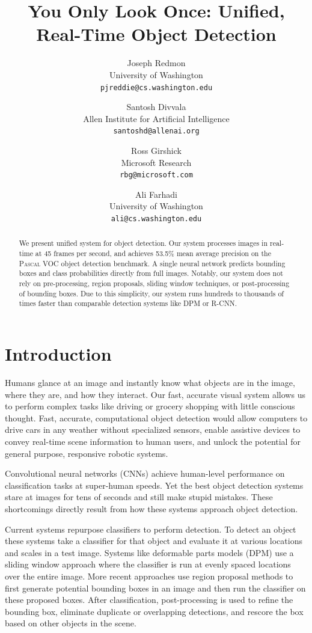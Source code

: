 \documentclass{article} %
\title{You Only Look Once: Unified, Real-Time Object Detection}
\author{Joseph Redmon\\
University of Washington\\
\texttt{pjreddie@cs.washington.edu}
\and
Santosh Divvala\\
Allen Institute for Artificial Intelligence\\
\texttt{santoshd@allenai.org}
\and
Ross Girshick\\
Microsoft Research\\
\texttt{rbg@microsoft.com}
\and
Ali Farhadi\\
University of Washington\\
\texttt{ali@cs.washington.edu}
}
\begin{document}
\maketitle

\begin{abstract}
We present unified system for object detection. Our system processes images in real-time at 45 frames per second, and achieves 53.5\% mean average precision on the \textsc{Pascal} VOC object detection benchmark. A single neural network predicts bounding boxes and class probabilities directly from full images. Notably, our system does not rely on pre-processing, region proposals, sliding window techniques, or post-processing of bounding boxes. Due to this simplicity, our system runs hundreds to thousands of times faster than comparable detection systems like DPM or R-CNN.
\end{abstract}

\section{Introduction}

Humans glance at an image and instantly know what objects are in the image, where they are, and how they interact. Our fast, accurate visual system allows us to perform complex tasks like driving or grocery shopping with little conscious thought. Fast, accurate, computational object detection would allow computers to drive cars in any weather without specialized sensors, enable assistive devices to convey real-time scene information to human users, and unlock the potential for general purpose, responsive robotic systems.

Convolutional neural networks (CNNs) achieve human-level performance on classification tasks at super-human speeds. Yet the best object detection systems stare at images for tens of seconds and still make stupid mistakes. These shortcomings directly result from how these systems approach object detection.

Current systems repurpose classifiers to perform detection. To detect an object these systems take a classifier for that object and evaluate it at various locations and scales in a test image. Systems like deformable parts models (DPM) use a sliding window approach where the classifier is run at evenly spaced locations over the entire image. More recent approaches use region proposal methods to first generate potential bounding boxes in an image and then run the classifier on these proposed boxes. After classification, post-processing is used to refine the bounding box, eliminate duplicate or overlapping detections, and rescore the box based on other objects in the scene.
\end{document}
